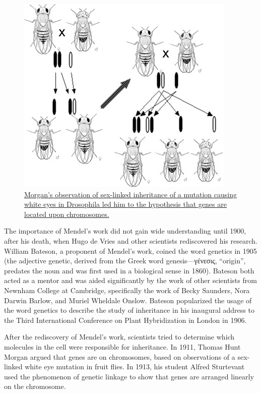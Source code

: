 \begin{figure}

{\centering \includegraphics[width=0.7\linewidth]{./figures/genetics/Sexlinked_inheritance_white} 

}

\caption{\href{https://commons.wikimedia.org/wiki/File:Sexlinked_inheritance_white.jpg}{Morgan's observation of sex-linked inheritance of a mutation causing white eyes in Drosophila led him to the hypothesis that genes are located upon chromosomes.}}\label{fig:sexlinked}
\end{figure}

The importance of Mendel's work did not gain wide understanding until 1900, after his death, when Hugo de Vries and other scientists rediscovered his research. William Bateson, a proponent of Mendel's work, coined the word genetics in 1905 (the adjective genetic, derived from the Greek word genesis---γένεσις, ``origin'', predates the noun and was first used in a biological sense in 1860). Bateson both acted as a mentor and was aided significantly by the work of other scientists from Newnham College at Cambridge, specifically the work of Becky Saunders, Nora Darwin Barlow, and Muriel Wheldale Onslow. Bateson popularized the usage of the word genetics to describe the study of inheritance in his inaugural address to the Third International Conference on Plant Hybridization in London in 1906.

After the rediscovery of Mendel's work, scientists tried to determine which molecules in the cell were responsible for inheritance. In 1911, Thomas Hunt Morgan argued that genes are on chromosomes, based on observations of a sex-linked white eye mutation in fruit flies. In 1913, his student Alfred Sturtevant used the phenomenon of genetic linkage to show that genes are arranged linearly on the chromosome.


